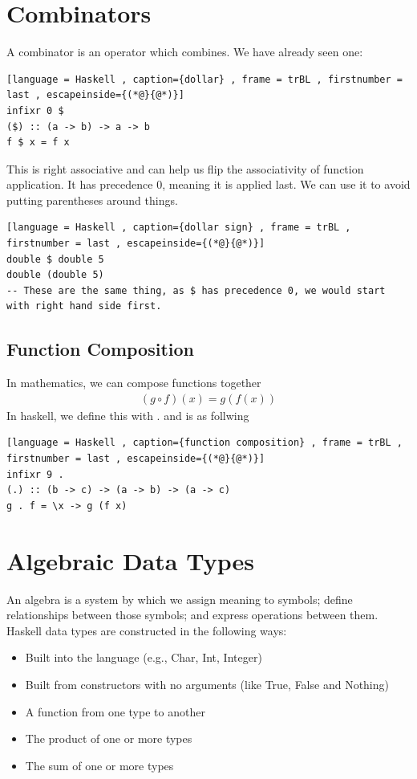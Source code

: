\documentclass[a4paper]{article}
\theoremstyle{plain}
\theoremstyle{definition}
\theoremstyle{remark}
\begin{document}
\section{Combinators}
A combinator is an operator which combines. We have already seen one:
\begin{lstlisting}[language = Haskell , caption={dollar} , frame = trBL , firstnumber = last , escapeinside={(*@}{@*)}]
infixr 0 $
($) :: (a -> b) -> a -> b
f $ x = f x
\end{lstlisting}
This is right associative and can help us flip the associativity of function application. It has precedence $0$, meaning it is applied last. We can use it to avoid putting parentheses around things.
\begin{lstlisting}[language = Haskell , caption={dollar sign} , frame = trBL , firstnumber = last , escapeinside={(*@}{@*)}]
double $ double 5
double (double 5)
-- These are the same thing, as $ has precedence 0, we would start with right hand side first.
\end{lstlisting}
\subsection{Function Composition}
In mathematics, we can compose functions together
\begin{align*}
	(g \circ f)(x) = g(f(x))
\end{align*}
In haskell, we define this with $.$ and is as follwing
\begin{lstlisting}[language = Haskell , caption={function composition} , frame = trBL , firstnumber = last , escapeinside={(*@}{@*)}]
infixr 9 .
(.) :: (b -> c) -> (a -> b) -> (a -> c)
g . f = \x -> g (f x)
\end{lstlisting}
\section{Algebraic Data Types}
An algebra is a system by which we assign meaning to symbols; define relationships between those symbols; and express operations between them. Haskell data types are constructed in the following ways:
\begin{itemize}
	\item Built into the language (e.g., Char, Int, Integer)
	\item Built from constructors with no arguments (like True, False and Nothing)
	\item A function from one type to another
	\item The product of one or more types
	\item The sum of one or more types
\end{itemize}
\end{document}
